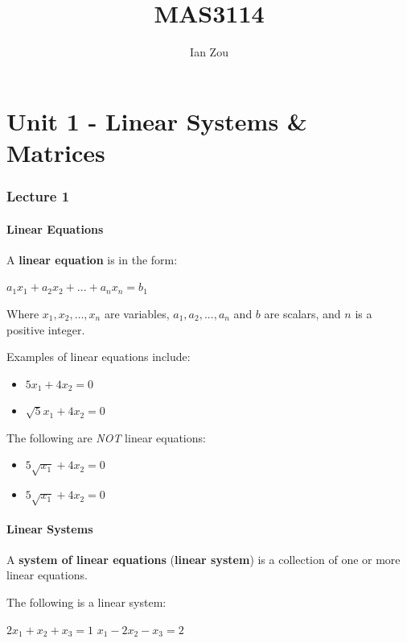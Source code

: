 \documentclass[12pt, letterpaper]{article}
\title{MAS3114}
\author{Ian Zou}
\begin{document}
\maketitle

\part*{Unit 1 - Linear Systems \& Matrices}

\section*{Lecture 1}

\subsection*{Linear Equations}

A \textbf{linear equation} is in the form:

\medskip
{\centering

  $ a_1 x_1 + a_2 x_2 + . . . + a_n x_n = b_1 $

}
\medskip

Where $ x_1, x_2, \hdots, x_n $ are variables, $ a_1, a_2, ..., a_n $
and $ b $ are scalars, and $ n $ is a positive integer.

\medskip

Examples of linear equations include:
\begin{itemize}
  \item $ 5x_1 + 4x_2 = 0 $
  \item $ \sqrt{5}x_1 + 4x_2 = 0 $
\end{itemize}

The following are \textit{NOT} linear equations:
\begin{itemize}
  \item $ 5\sqrt{x_1} + 4x_2 = 0 $
  \item $ 5\sqrt{x_1} + 4x_2 = 0 $
\end{itemize}

\subsection*{Linear Systems}

A \textbf{system of linear equations} (\textbf{linear system}) is a
collection of one or more linear equations.
\medskip

The following is a linear system:

\medskip
{\centering

  $ 2x_1 + x_2 + x_3 = 1 $
  $ x_1 - 2x_2 - x_3 = 2 $

}
\medskip
\end{document}
